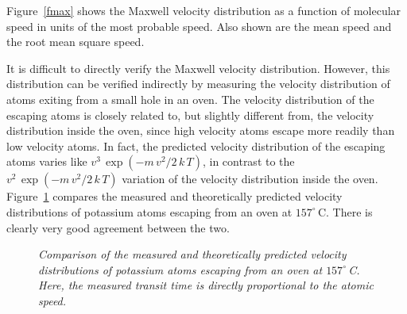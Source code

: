 Figure~\ref{fmax} shows the Maxwell velocity distribution as a function
of molecular speed in units of the most probable speed. Also shown are the
mean speed and the root mean square speed.

It is difficult to directly verify the Maxwell velocity distribution. However, this
distribution can be verified indirectly by measuring the velocity distribution
of atoms exiting from a small hole in an oven. The velocity distribution of
the escaping atoms is closely related to, but slightly different from, the velocity
distribution inside the oven, since high velocity atoms escape more readily
than low velocity atoms. In fact, the predicted velocity distribution of
the escaping atoms varies like $v^3\,\exp(-m\,v^2/2\,k\,T)$, in contrast
to the  $v^2\,\exp(-m\,v^2/2\,k\,T)$ variation of the velocity distribution
inside the oven. Figure~\ref{feff} compares the measured and 
theoretically predicted
velocity distributions of potassium atoms escaping from an oven at
$157^\circ$\,C. There is clearly very good agreement between the two.  

\begin{figure}[ht]
\epsfysize=3in
\centerline{}
\caption{\em Comparison of the measured and theoretically
predicted velocity distributions of potassium atoms escaping from an oven at
$157^\circ$\,C. Here, the measured transit time is directly proportional
to the atomic speed.}\label{feff}
\end{figure}
